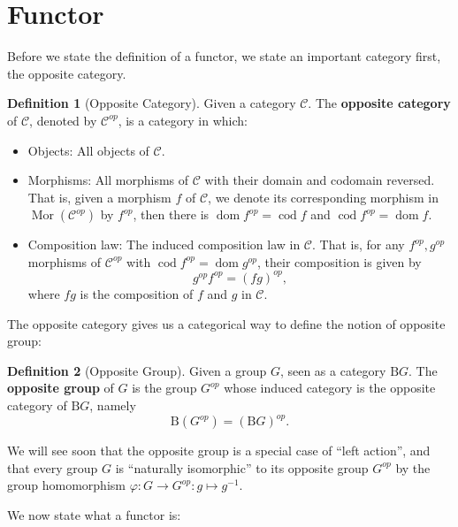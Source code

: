 \documentclass{article}
\theoremstyle{definition}
\newtheorem{definition}{Definition}[section]
\theoremstyle{definition}
\theoremstyle{remark}
\DeclareMathOperator{\Mor}{Mor}
\DeclareMathOperator{\dom}{dom}
\DeclareMathOperator{\cod}{cod}
\begin{document}
\section{Functor}
Before we state the definition of a functor, we state an important category first, the opposite category.
	\begin{definition}[Opposite Category]
	Given a category $\mathcal{C}$. The \textbf{opposite category} of $\mathcal{C}$, denoted by $\mathcal{C}^{op}$, is a category in which:
		\begin{itemize}
			\item Objects: All objects of $\mathcal{C}$.
			\item Morphisms: All morphisms of $\mathcal{C}$ with their domain and codomain reversed. That is, given a morphism $f$ of $\mathcal{C}$, we denote its corresponding morphism in $\Mor(\mathcal{C}^{op})$ by $f^{op}$, then there is $\dom f^{op}=\cod f$ and $\cod f^{op}=\dom f$.
				\item Composition law: The induced composition law in $\mathcal{C}$. That is, for any $f^{op},g^{op}$ morphisms of $\mathcal{C}^{op}$ with $\cod f^{op}=\dom g^{op}$, their composition is given by
			\[g^{op}f^{op}=(fg)^{op},\]
		where $fg$ is the composition of $f$ and $g$ in $\mathcal{C}$. 
		\end{itemize}
	\end{definition}
	The opposite category gives us a categorical way to define the notion of opposite group:
	\begin{definition}[Opposite Group]
	Given a group $G$, seen as a category $\mathrm{B}G$. The \textbf{opposite group} of $G$ is the group $G^{op}$ whose induced category is the opposite category of $\mathrm{B}G$, namely
	\[\mathrm{B}(G^{op})=(\mathrm{B}G)^{op}.\]
	\end{definition}
	We will see soon that the opposite group is a special case of ``left action'', and that every group $G$ is ``naturally isomorphic'' to its opposite group $G^{op}$ by the group homomorphism $\varphi:G\to G^{op}:g\mapsto g^{-1}$. \par
	We now state what a functor is:
\end{document}
